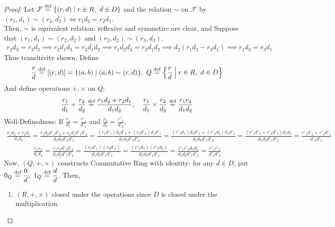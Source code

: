 \documentclass[8pt]{report}
\theoremstyle{romanstyle}
\newcommand{\dis}{\displaystyle}
\newcommand{\defequal}{\overset{\textnormal{def}}{=}}
\begin{document}
\begin{proof}
    Let $\mathcal{F} \defequal \{(r,d) \mid r \in R,\ d \in D\}$ and the relation $\sim$ on $\mathcal{F}$
    by $(r_1, d_1) \sim (r_2, d_2) \iff r_1d_2 = r_2d_1$.\\
    Then, $\sim$ is equivalent relation: reflexive and symmetirc are clear, and
    Suppose that $(r_1, d_1) \sim (r_2, d_2)$ and $(r_2, d_2) \sim (r_3, d_3)$.
    \begin{align*}
        r_2d_3 = r_3d_2 \implies r_2 d_1 d_3 = r_3 d_1 d_2 \implies r_1 d_2 d_3 = r_3 d_1 d_2 \implies d_2 ( r_1 d_3 - r_3 d_1) \implies r_1d_3 = r_3d_1
    \end{align*}
    Thus transitivity shown. Define
    \begin{align*}
        \frac{r}{d} \defequal [(r,d)] = \{(a,b) \mid (a,b) \sim (r,d) \},\ Q \defequal \left\{ \frac{r}{d} \;\middle|\; r \in R,\ d \in D \right\}
    \end{align*}
    And define operations $+, \times$ on $Q$:
    \begin{align*}
        \frac{r_1}{d_1} + \frac{r_2}{d_2} \defequal \frac{r_1d_2 + r_2d_1}{d_1 d_2}, \quad
        \frac{r_1}{d_1} \times \frac{r_2}{d_2} \defequal \frac{r_1r_2}{d_1d_2}
    \end{align*}
    Well-Definedness: If $\dis \frac{r_1}{d_1} = \frac{r'_1}{d'_1}$ and $\dis \frac{r_2}{d_2} = \frac{r'_2}{d'_2}$,
    \begin{align*}
        \frac{r_1d_2 + r_2d_1}{d_1 d_2}
        = \frac{r_1 d_2 d'_1 d'_2 + r_2 d_1 d'_1 d'_2}{d_1 d_2 d'_1 d'_2}
        = \frac{(r_1 d'_1) d_2 d'_2 + (r_2 d'_2) d_1 d'_1 }{d_1 d_2 d'_1 d'_2}
        = \frac{(r'_1 d_1) d_2 d'_2 + (r'_2 d_2) d_1 d'_1 }{d_1 d_2 d'_1 d'_2}
        = \frac{(r'_1d'_2 + r'_2d'_1)d_1d_2}{d_1d_2 d'_1 d'_2}
        = \frac{r'_1d'_2 + r'_2d'_1}{d'_1 d'_2}
    \end{align*}
    \begin{align*}
        \frac{r_1r_2}{d_1d_2} 
        = \frac{r_1 r_2 d'_1 d'_2}{d_1d_2d'_1d'_2}
        = \frac{(r_1 d'_1) (r_2 d'_2)}{d_1d_2d'_1d'_2}
        = \frac{(r'_1 d_1) (r'_2 d_2)}{d_1d_2d'_1d'_2}
        = \frac{r'_1 r'_2 d_1 d_2}{d_1d_2d'_1d'_2}
        = \frac{r'_1 r'_2}{d'_1d'_2}
    \end{align*}
    Now, $(Q, +, \times)$ constructs Commutative Ring with identity: for any $d \in D$, 
    put $\dis 0_Q \defequal \frac{0}{d},\ 1_Q \defequal \frac{d}{d}$. Then,
    \begin{enumerate}
        \item $(R, +, \times)$ closed under the operations since $D$ is closed under the multiplication.

\end{enumerate}
\end{proof}
\end{document}
